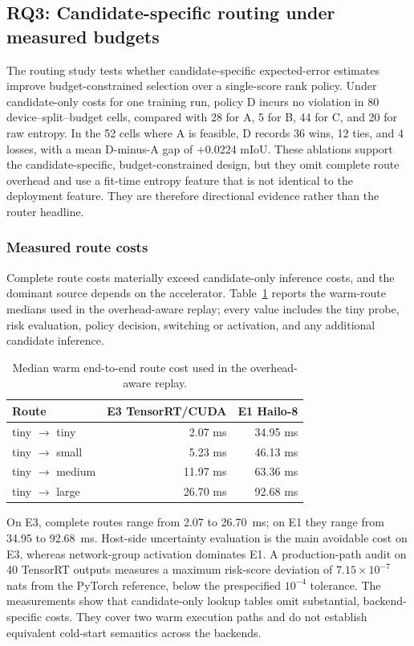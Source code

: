 \documentclass[a4paper,review,12pt]{elsarticle}
\newcommand{\miou}{mIoU}
\begin{document}
\subsection{RQ3: Candidate-specific routing under measured budgets}

The routing study tests whether candidate-specific expected-error estimates improve budget-constrained selection over a single-score rank policy. Under candidate-only costs for one training run, policy D incurs no violation in 80 device--split--budget cells, compared with 28 for A, 5 for B, 44 for C, and 20 for raw entropy. In the 52 cells where A is feasible, D records 36 wins, 12 ties, and 4 losses, with a mean D-minus-A gap of +0.0224 \miou{}. These ablations support the candidate-specific, budget-constrained design, but they omit complete route overhead and use a fit-time entropy feature that is not identical to the deployment feature. They are therefore directional evidence rather than the router headline.

\subsubsection{Measured route costs}

Complete route costs materially exceed candidate-only inference costs, and the dominant source depends on the accelerator. Table~\ref{tab:routes} reports the warm-route medians used in the overhead-aware replay; every value includes the tiny probe, risk evaluation, policy decision, switching or activation, and any additional candidate inference.

\begin{table}[H]
\centering
\caption{Median warm end-to-end route cost used in the overhead-aware replay.}
\label{tab:routes}
\begin{tabular}{@{}lrr@{}}
\toprule
Route & E3 TensorRT/CUDA & E1 Hailo-8 \\
\midrule
tiny $\rightarrow$ tiny & 2.07 ms & 34.95 ms \\
tiny $\rightarrow$ small & 5.23 ms & 46.13 ms \\
tiny $\rightarrow$ medium & 11.97 ms & 63.36 ms \\
tiny $\rightarrow$ large & 26.70 ms & 92.68 ms \\
\bottomrule
\end{tabular}
\end{table}

On E3, complete routes range from 2.07 to 26.70~ms; on E1 they range from 34.95 to 92.68~ms. Host-side uncertainty evaluation is the main avoidable cost on E3, whereas network-group activation dominates E1. A production-path audit on 40 TensorRT outputs measures a maximum risk-score deviation of $7.15\times10^{-7}$ nats from the PyTorch reference, below the prespecified $10^{-4}$ tolerance. The measurements show that candidate-only lookup tables omit substantial, backend-specific costs. They cover two warm execution paths and do not establish equivalent cold-start semantics across the backends.
\end{document}
